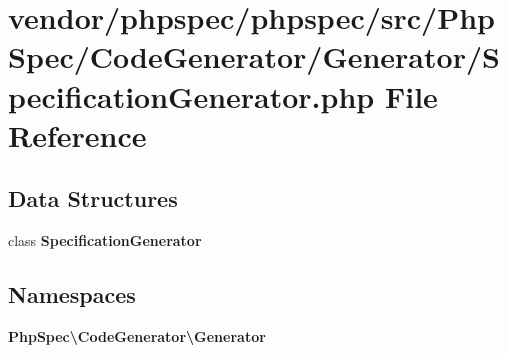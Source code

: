 \section{vendor/phpspec/phpspec/src/\+Php\+Spec/\+Code\+Generator/\+Generator/\+Specification\+Generator.php File Reference}
\label{_specification_generator_8php}
\subsection*{Data Structures}
\begin{DoxyCompactItemize}
\item 
class {\bf Specification\+Generator}
\end{DoxyCompactItemize}
\subsection*{Namespaces}
\begin{DoxyCompactItemize}
\item 
 {\bf Php\+Spec\textbackslash{}\+Code\+Generator\textbackslash{}\+Generator}
\end{DoxyCompactItemize}
